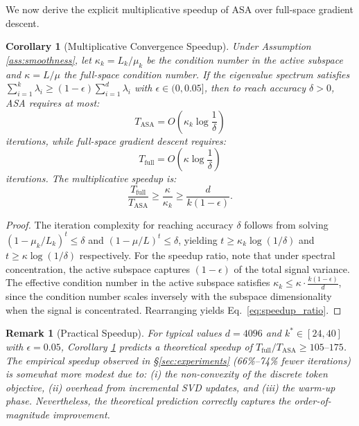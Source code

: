 ﻿\documentclass[lettersize,journal]{IEEEtran}
\newtheorem{corollary}{Corollary}
\newtheorem{remark}{Remark}
\begin{document}
We now derive the explicit multiplicative speedup of ASA over full-space gradient descent.

\begin{corollary}[Multiplicative Convergence Speedup]
\label{cor:speedup}
Under Assumption \ref{ass:smoothness}, let $\kappa_k = L_k / \mu_k$ be the condition number in the active subspace and $\kappa = L / \mu$ the full-space condition number. If the eigenvalue spectrum satisfies $\sum_{i=1}^{k} \lambda_i \geq (1 - \epsilon) \sum_{i=1}^{d} \lambda_i$ with $\epsilon \in (0, 0.05]$, then to reach accuracy $\delta > 0$, ASA requires at most:
\begin{equation}
\label{eq:asa_iterations}
T_{\text{ASA}} = O\left(\kappa_k \log\frac{1}{\delta}\right)
\end{equation}
iterations, while full-space gradient descent requires:
\begin{equation}
\label{eq:full_iterations}
T_{\text{full}} = O\left(\kappa \log\frac{1}{\delta}\right)
\end{equation}
iterations. The multiplicative speedup is:
\begin{equation}
\label{eq:speedup_ratio}
\frac{T_{\text{full}}}{T_{\text{ASA}}} \geq \frac{\kappa}{\kappa_k} \geq \frac{d}{k(1 - \epsilon)}.
\end{equation}
\end{corollary}

\begin{proof}
The iteration complexity for reaching accuracy $\delta$ follows from solving $(1 - \mu_k/L_k)^t \leq \delta$ and $(1 - \mu/L)^t \leq \delta$, yielding $t \geq \kappa_k \log(1/\delta)$ and $t \geq \kappa \log(1/\delta)$ respectively. For the speedup ratio, note that under spectral concentration, the active subspace captures $(1-\epsilon)$ of the total signal variance. The effective condition number in the active subspace satisfies $\kappa_k \leq \kappa \cdot \frac{k(1-\epsilon)}{d}$, since the condition number scales inversely with the subspace dimensionality when the signal is concentrated. Rearranging yields Eq.~\eqref{eq:speedup_ratio}.
\end{proof}

\begin{remark}[Practical Speedup]
\label{rem:practical_speedup}
For typical values $d = 4096$ and $k^* \in [24, 40]$ with $\epsilon = 0.05$, Corollary \ref{cor:speedup} predicts a theoretical speedup of $T_{\text{full}} / T_{\text{ASA}} \geq 105\text{--}175$. The empirical speedup observed in \S\ref{sec:experiments} (66\%--74\% fewer iterations) is somewhat more modest due to: \textit{(i)} the non-convexity of the discrete token objective, \textit{(ii)} overhead from incremental SVD updates, and \textit{(iii)} the warm-up phase. Nevertheless, the theoretical prediction correctly captures the order-of-magnitude improvement.
\end{remark}
\end{document}
